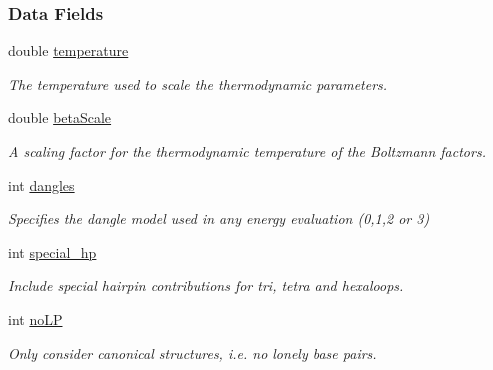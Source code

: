 \subsubsection*{Data Fields}
\begin{DoxyCompactItemize}
\item 
\mbox{\label{group__model__details_a5f7e5c2b65bada5188443470e576aa4b}} 
double \hyperlink{group__model__details_a5f7e5c2b65bada5188443470e576aa4b}{temperature}
\begin{DoxyCompactList}\small\item\em The temperature used to scale the thermodynamic parameters. \end{DoxyCompactList}\item 
\mbox{\label{group__model__details_a19524bf1d8d7ab590ed36edbbcaaba2c}} 
double \hyperlink{group__model__details_a19524bf1d8d7ab590ed36edbbcaaba2c}{beta\+Scale}
\begin{DoxyCompactList}\small\item\em A scaling factor for the thermodynamic temperature of the Boltzmann factors. \end{DoxyCompactList}\item 
int \hyperlink{group__model__details_adcda4ff2ea77748ae0e8700288282efc}{dangles}
\begin{DoxyCompactList}\small\item\em Specifies the dangle model used in any energy evaluation (0,1,2 or 3) \end{DoxyCompactList}\item 
\mbox{\label{group__model__details_add64a96d23e77ef1d0ddf8dfc5228143}} 
int \hyperlink{group__model__details_add64a96d23e77ef1d0ddf8dfc5228143}{special\+\_\+hp}
\begin{DoxyCompactList}\small\item\em Include special hairpin contributions for tri, tetra and hexaloops. \end{DoxyCompactList}\item 
\mbox{\label{group__model__details_a753200bf21cee0ea2df64afe43999f5d}} 
int \hyperlink{group__model__details_a753200bf21cee0ea2df64afe43999f5d}{no\+LP}
\begin{DoxyCompactList}\small\item\em Only consider canonical structures, i.\+e. no \textquotesingle{}lonely\textquotesingle{} base pairs. \end{DoxyCompactList}\item 

\end{DoxyCompactItemize}
